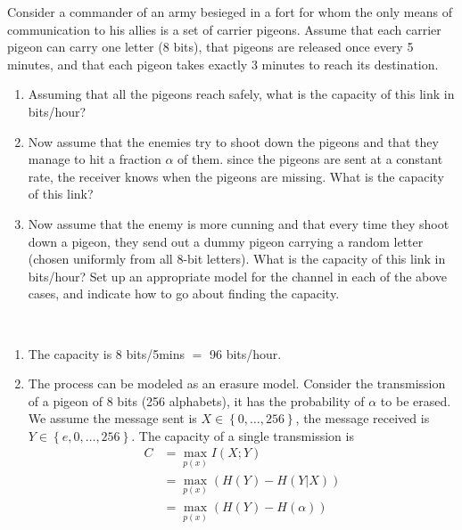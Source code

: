 \begin{exercise}{Consider a commander of an army besieged in a fort for whom the only means of communication to his allies is a set of carrier pigeons. Assume that each carrier pigeon can carry one letter (8 bits), that pigeons are released once every 5 minutes, and that each pigeon takes exactly 3 minutes to reach its destination.
  \begin{enumerate}
    \item Assuming that all the pigeons reach safely, what is the capacity of this link in bits/hour?
    \item Now assume that the enemies try to shoot down the pigeons and that they manage to hit a fraction $\alpha$ of them. since the pigeons are sent at a constant rate, the receiver knows when the pigeons are missing. What is the capacity of this link?
    \item Now assume that the enemy is more cunning and that every time they shoot down a pigeon, they send out a dummy pigeon carrying a random letter (chosen uniformly from all 8-bit letters). What is the capacity of this link in bits/hour? Set up an appropriate model for the channel in each of the above cases, and indicate how to go about finding the capacity.
  \end{enumerate}}
  \begin{solution}
  \par{~}
  \begin{enumerate}
    \item { The capacity is 8 bits/5mins $=$ 96 bits/hour.
    }
    \item { The process can be modeled as an erasure model. Consider the transmission of a pigeon of 8 bits (256 alphabets), it has the probability of $\alpha$ to be erased. We assume the message sent is $X \in \left\{0, \ldots, 256 \right\}$, the message received is $Y \in \left\{e, 0, \ldots, 256\right\}$. The capacity of a single transmission is
    \begin{equation}
      \begin{aligned}
        C &=\max _{p(x)} I(X ; Y) \\
        &=\max _{p(x)}(H(Y)-H(Y | X))\\
        &=\max _{p(x)} (H(Y)-H(\alpha)) \\

\end{aligned}
\end{equation}}
\end{enumerate}
\end{solution}
\end{exercise}
